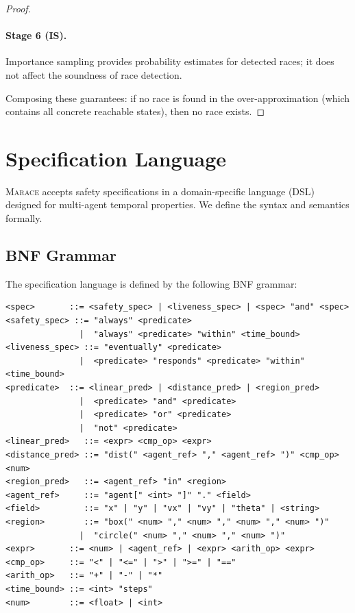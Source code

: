 \documentclass[11pt]{article}
\newcommand{\marace}{\textsc{Marace}}
\begin{document}
\begin{proof}
\paragraph{Stage 6 (IS).} Importance sampling provides probability estimates
for detected races; it does not affect the soundness of race detection.

Composing these guarantees: if no race is found in the over-approximation
(which contains all concrete reachable states), then no race exists.
\end{proof}


\section{Specification Language}
\label{app:spec}

\marace{} accepts safety specifications in a domain-specific language (DSL)
designed for multi-agent temporal properties. We define the syntax and semantics
formally.

\subsection{BNF Grammar}

The specification language is defined by the following BNF grammar:

\begin{small}
\begin{verbatim}
<spec>       ::= <safety_spec> | <liveness_spec> | <spec> "and" <spec>
<safety_spec> ::= "always" <predicate>
               |  "always" <predicate> "within" <time_bound>
<liveness_spec> ::= "eventually" <predicate>
               |  <predicate> "responds" <predicate> "within" <time_bound>
<predicate>  ::= <linear_pred> | <distance_pred> | <region_pred>
               |  <predicate> "and" <predicate>
               |  <predicate> "or" <predicate>
               |  "not" <predicate>
<linear_pred>   ::= <expr> <cmp_op> <expr>
<distance_pred> ::= "dist(" <agent_ref> "," <agent_ref> ")" <cmp_op> <num>
<region_pred>   ::= <agent_ref> "in" <region>
<agent_ref>     ::= "agent[" <int> "]" "." <field>
<field>         ::= "x" | "y" | "vx" | "vy" | "theta" | <string>
<region>        ::= "box(" <num> "," <num> "," <num> "," <num> ")"
               |  "circle(" <num> "," <num> "," <num> ")"
<expr>       ::= <num> | <agent_ref> | <expr> <arith_op> <expr>
<cmp_op>     ::= "<" | "<=" | ">" | ">=" | "=="
<arith_op>   ::= "+" | "-" | "*"
<time_bound> ::= <int> "steps"
<num>        ::= <float> | <int>
\end{verbatim}
\end{small}
\end{document}
